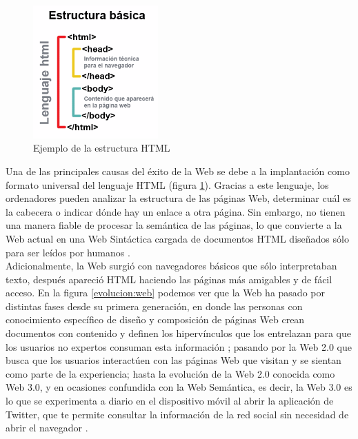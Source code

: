 \begin{figure}[H]
	\centering
	\includegraphics[height=5.1cm]{imagenes/capitulo3/estructurabasica} 
	\caption{Ejemplo de la estructura HTML \cite{imagen-html}}
	\label{html}
\end{figure}

Una de las principales causas del éxito de la Web se debe a la implantación como formato universal del lenguaje HTML (figura \ref{html}). Gracias a este lenguaje, los ordenadores pueden analizar la estructura de las páginas Web, determinar cuál es la cabecera o indicar dónde hay un enlace a otra página. Sin embargo, no tienen una manera fiable de procesar la semántica de las páginas, lo que convierte a la Web actual en una Web Sintáctica cargada de documentos HTML diseñados sólo para ser leídos por humanos \cite{apuntes-clase-jose}.\\

Adicionalmente, la Web surgió con navegadores básicos que sólo interpretaban texto, después apareció HTML haciendo las páginas más amigables y de fácil acceso. En la figura \ref{evolucion:web} podemos ver que la Web ha pasado por distintas fases desde su primera generación, en donde las personas con conocimiento específico de diseño y composición de páginas Web crean documentos con contenido y definen los hipervínculos que los entrelazan para que los usuarios no expertos consuman esta información \cite{cwb}; pasando por la  Web 2.0 que busca que los usuarios interactúen con las páginas Web que visitan y se sientan como parte de la experiencia; hasta la evolución de la Web 2.0 conocida como Web 3.0, y en ocasiones confundida con la Web Semántica, es decir, la Web 3.0 es lo que se experimenta a diario en el dispositivo móvil al abrir la aplicación de Twitter, que te permite consultar la información de la red social sin necesidad de abrir el navegador \cite{web-nueva}.

